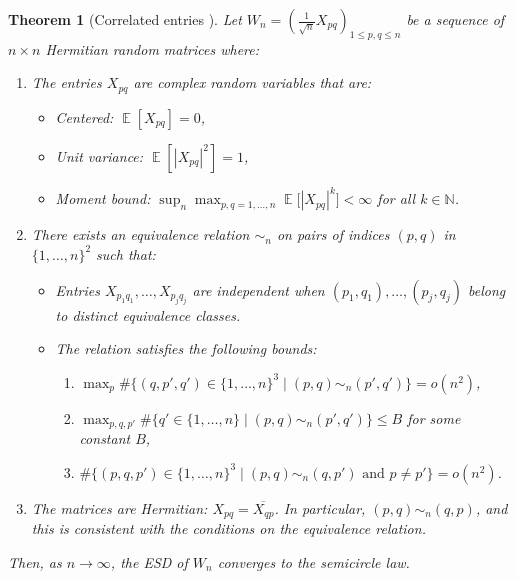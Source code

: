 \documentclass[letterpaper,11pt,oneside,reqno]{article}
\numberwithin{equation}{section}
\newtheorem{theorem}[proposition]{Theorem}
\theoremstyle{definition}
\begin{document}
\begin{theorem}[Correlated entries \cite{schenker2005semicircle}]
Let $W_n = \left(\frac{1}{\sqrt{n}} X_{pq}\right)_{1 \leq p,q \leq n}$
be a sequence of $n \times n$ Hermitian random matrices where:

\begin{enumerate}
\item The entries $X_{pq}$ are complex random variables that are:
		\begin{itemize}
		\item \textit{Centered:} $\operatorname{\mathbb{E}}[X_{pq}] = 0$,
		\item \textit{Unit variance:} $\operatorname{\mathbb{E}}[|X_{pq}|^2] = 1$,
		\item \textit{Moment bound:}
				$\displaystyle \sup_n \max_{p,q=1,\ldots,n} \operatorname{\mathbb{E}}\big[|X_{pq}|^k\big] < \infty$
				for all $k \in \mathbb{N}$.
		\end{itemize}

\item There exists an equivalence relation $\sim_n$ on pairs of indices $(p,q)$ in $\{1,\ldots,n\}^2$ such that:
		\begin{itemize}
		\item Entries $X_{p_1q_1},\ldots,X_{p_jq_j}$ are independent when
				$(p_1,q_1),\ldots,(p_j,q_j)$ belong to distinct equivalence classes.
		\item The relation satisfies the following bounds:
				\begin{enumerate}
			\item $\max_p \#\big\{(q,p',q') \in \{1,\ldots,n\}^3 \mid (p,q) \sim_n (p',q')\big\} = o(n^2)$,
				\item $\max_{p,q,p'} \#\big\{q' \in \{1,\ldots,n\} \mid (p,q) \sim_n (p',q')\big\} \leq B$ for some constant $B$,
				\item $\#\big\{(p,q,p') \in \{1,\ldots,n\}^3 \mid (p,q) \sim_n (q,p') \text{ and } p \neq p'\big\} = o(n^2)$.
				\end{enumerate}
		\end{itemize}

\item The matrices are Hermitian: $X_{pq} = \overline{X_{qp}}$.
	In particular, $(p,q)\sim_n (q,p)$, and this is consistent with the
	conditions on the equivalence relation.
\end{enumerate}

Then, as $n \to \infty$, the ESD of $W_n$ converges to the semicircle law.
\end{theorem}
\end{document}
